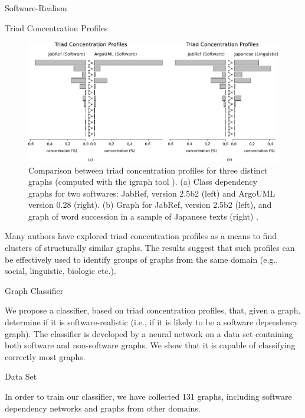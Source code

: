 \documentclass[11pt,twocolumn,a4paper,english]{article}
\newcommand{\TODO}{\textbf{TODO:} }
\begin{document}
\begin{section}{Software-Realism}
\begin{subsection}{Triad Concentration Profiles}
	\begin{figure}[htbp]
		\centering
			\includegraphics[scale=1]{figures/tcp}
		\caption{Comparison between triad concentration profiles for three distinct graphs (computed with the igraph tool \cite{igraph}). (a) Class dependency graphs for two softwares: JabRef, version 2.5b2 (left) and ArgoUML version 0.28 (right). (b) Graph for JabRef, version 2.5b2 (left), and graph of word succession in a sample of Japanese texts (right) \cite{Milo2004}.}
		\label{fig:tcp}
	\end{figure}
	
	Many authors \cite{Milo2004,Ma2007,Lin2008} have explored triad concentration profiles as a means to find clusters of structurally similar graphs. The results suggest that such profiles can be effectively used to identify groups of graphs from the same domain (e.g., social, linguistic, biologic etc.).
			
\end{subsection}

\begin{subsection}{Graph Classifier}

We propose a classifier, based on triad concentration profiles, that, given a graph, determine if it is software-realistic (i.e., if it is likely to be a software dependency graph). The classifier is developed by a neural network on a data set containing both software and non-software graphs. We show that it is capable of classifying correctly most graphs.


\begin{subsubsection}{Data Set} \label{sec:data-set}
	
	In order to train our classifier, we have collected 131 graphs, including software dependency networks and graphs from other domains.
	

\end{subsubsection}
\end{subsection}
\end{section}
\end{document}
